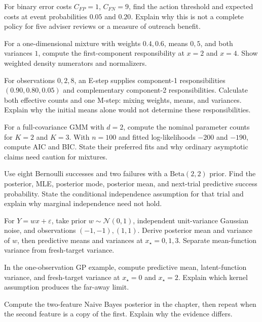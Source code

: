 \begin{exercises}
\item {}For binary error costs $C_{FP}=1$, $C_{FN}=9$, find the action threshold and expected costs at event probabilities $0.05$ and $0.20$. Explain why this is not a complete policy for five adviser reviews or a measure of outreach benefit.
\item {}For a one-dimensional mixture with weights $0.4,0.6$, means $0,5$, and both variances $1$, compute the first-component responsibility at $x=2$ and $x=4$. Show weighted density numerators and normalizers.
\item {}For observations $0,2,8$, an E-step supplies component-1 responsibilities $(0.90,0.80,0.05)$ and complementary component-2 responsibilities. Calculate both effective counts and one M-step: mixing weights, means, and variances. Explain why the initial means alone would not determine these responsibilities.
\item {}For a full-covariance GMM with $d=2$, compute the nominal parameter counts for $K=2$ and $K=3$. With $n=100$ and fitted log-likelihoods $-200$ and $-190$, compute AIC and BIC. State their preferred fits and why ordinary asymptotic claims need caution for mixtures.
\item {}Use eight Bernoulli successes and two failures with a $\mathrm{Beta}(2,2)$ prior. Find the posterior, MLE, posterior mode, posterior mean, and next-trial predictive success probability. State the conditional independence assumption for that trial and explain why marginal independence need not hold.
\item {}For $Y=wx+\varepsilon$, take prior $w\sim\mathcal N(0,1)$, independent unit-variance Gaussian noise, and observations $(-1,-1),(1,1)$. Derive posterior mean and variance of $w$, then predictive means and variances at $x_\star=0,1,3$. Separate mean-function variance from fresh-target variance.
\item {}In the one-observation GP example, compute predictive mean, latent-function variance, and fresh-target variance at $x_\star=0$ and $x_\star=2$. Explain which kernel assumption produces the far-away limit.
\item {}Compute the two-feature Naive Bayes posterior in the chapter, then repeat when the second feature is a copy of the first. Explain why the evidence differs.

\end{exercises}
